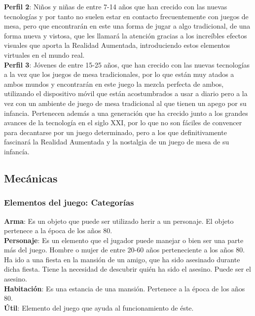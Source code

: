 \textbf{Perfil 2}: Niños y niñas de entre 7-14 años que han crecido con las nuevas tecnologías y por tanto no suelen estar en contacto frecuentemente con juegos de mesa, pero que encontrarán en este una forma de jugar a algo tradicional, de una forma nueva y vistosa, que les llamará la atención gracias a los increíbles efectos visuales que aporta la Realidad Aumentada, introduciendo estos elementos virtuales en el mundo real.\\

\textbf{Perfil 3}: Jóvenes de entre 15-25 años, que han crecido con las nuevas tecnologías a la vez que los juegos de mesa tradicionales, por lo que están muy atados a ambos mundos y encontrarán en este juego la mezcla perfecta de ambos, utilizando el dispositivo móvil que están acostumbrados a usar a diario pero a la vez con un ambiente de juego de mesa tradicional al que tienen un apego por su infancia. Pertenecen además a una generación que ha crecido junto a los grandes avances de la tecnología en el siglo XXI, por lo que no son fáciles de convencer para decantarse por un juego determinado, pero a los que definitivamente fascinará la Realidad Aumentada y la nostalgia de un juego de mesa de su infancía.

\subsection{Mecánicas}
\subsubsection{Elementos del juego: Categorías}
\textbf{Arma}: Es un objeto que puede ser utilizado herir a un personaje. El objeto pertenece a la época de los años 80.\\
\textbf{Personaje}: Es un elemento que el jugador puede manejar o bien ser una parte más del juego. Hombre o mujer de entre 20-60 años perteneciente a los años 80. Ha ido a una fiesta en la mansión de un amigo, que ha sido asesinado durante dicha fiesta. Tiene la necesidad de descubrir quién ha sido el asesino. Puede ser el asesino.\\
\textbf{Habitación}: Es una estancia de una mansión. Pertenece a la época de los años 80.\\
\textbf{Útil}: Elemento del juego que ayuda al funcionamiento de éste.


